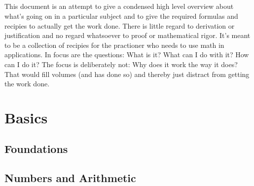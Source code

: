 \documentclass[12pt]{book}  %
\begin{document}
\paragraph{}
This document is an attempt to give a condensed high level overview about what's going on in a particular subject and to give the required formulas and recipies to actually get the work done. There is little regard to derivation or justification and no regard whatsoever to proof or mathematical rigor. It's meant to be a collection of recipies for the practioner who needs to use math in applications. In focus are the questions: What is it? What can I do with it? How can I do it? The focus is deliberately not: Why does it work the way it does? That would fill volumes (and has done so) and thereby just distract from getting the work done.

\chapter{Basics}
\section{Foundations} 
  
\section{Numbers and Arithmetic} 
 
\end{document}
